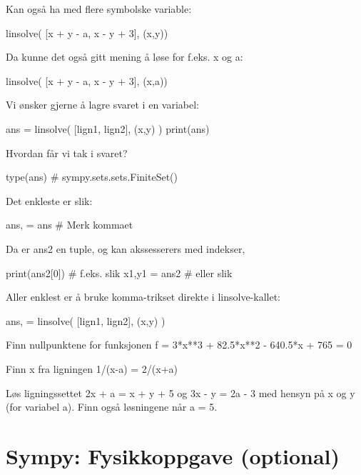 Kan også ha med flere symbolske variable: 
\begin{usncodebox}
linsolve( [x + y - a, x - y + 3], (x,y))
\end{usncodebox}

Da kunne det også gitt mening å løse for f.eks. x og a:
\begin{usncodebox}
linsolve( [x + y - a, x - y + 3], (x,a))
\end{usncodebox}

Vi ønsker gjerne å lagre svaret i en variabel:
\begin{usncodebox}
ans = linsolve( [lign1, lign2], (x,y) )  
print(ans)
\end{usncodebox}

Hvordan får vi tak i svaret?
\begin{usncodebox}
type(ans)     # sympy.sets.sets.FiniteSet()
\end{usncodebox}

Det enkleste er slik:
\begin{usncodebox}
ans, = ans    # Merk kommaet
\end{usncodebox}

Da er ans2 en tuple, og kan akssesserers med indekser,
\begin{usncodebox}
print(ans2[0])  # f.eks. slik
x1,y1 = ans2    # eller slik 
\end{usncodebox}

Aller enklest er å bruke komma-trikset direkte i linsolve-kallet: 
\begin{usncodebox}
ans, = linsolve( [lign1, lign2], (x,y) )  
\end{usncodebox}

\begin{question}
Finn nullpunktene for funksjonen f = 3*x**3 + 82.5*x**2 - 640.5*x + 765 = 0
\end{question}

\begin{question}
Finn x fra ligningen   1/(x-a) = 2/(x+a)
\end{question}

\begin{question}
Løs ligningssettet 2x + a = x + y + 5  og  3x - y = 2a - 3  med hensyn på x og y (for variabel a).
Finn også løsningene når a = 5. 
\end{question}

\section{Sympy: Fysikkoppgave (optional)}

